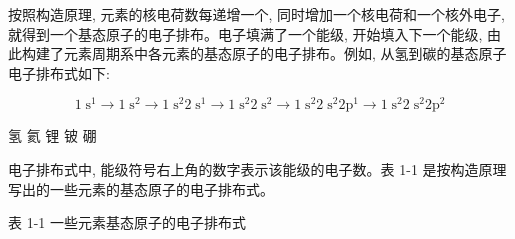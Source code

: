\documentclass[10pt]{article}
\begin{document}
按照构造原理, 元素的核电荷数每递增一个, 同时增加一个核电荷和一个核外电子, 就得到一个基态原子的电子排布。电子填满了一个能级, 开始填入下一个能级, 由此构建了元素周期系中各元素的基态原子的电子排布。例如, 从氢到碳的基态原子电子排布式如下:

\[
1{\mathrm{\;s}}^{1} \rightarrow 1{\mathrm{\;s}}^{2} \rightarrow 1{\mathrm{\;s}}^{2}2{\mathrm{\;s}}^{1} \rightarrow 1{\mathrm{\;s}}^{2}2{\mathrm{\;s}}^{2} \rightarrow 1{\mathrm{\;s}}^{2}2{\mathrm{\;s}}^{2}2{\mathrm{p}}^{1} \rightarrow 1{\mathrm{\;s}}^{2}2{\mathrm{\;s}}^{2}2{\mathrm{p}}^{2}
\]

氢 氦 锂 铍 硼

电子排布式中, 能级符号右上角的数字表示该能级的电子数。表 1-1 是按构造原理写出的一些元素的基态原子的电子排布式。

表 1-1 一些元素基态原子的电子排布式
\end{document}

